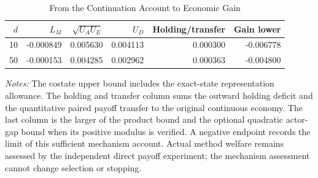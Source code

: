 \begin{table}[!htbp]
\centering
\footnotesize
\caption{From the Continuation Account to Economic Gain}\label{tab:r15mechanismwelfare}
\begin{tabular}{rrrrrr}
\toprule
$d$ & $L_M$ & $\sqrt{U_AU_E}$ & $U_D$ & Holding/transfer & Gain lower \\
\midrule
10 & -0.000849 & 0.005630 & 0.004113 & 0.000300 & -0.006778 \\
50 & -0.000153 & 0.004285 & 0.002962 & 0.000363 & -0.004800 \\
\bottomrule
\end{tabular}
\begin{minipage}{0.97\linewidth}\footnotesize
\emph{Notes:} The costate upper bound includes the exact-state representation allowance. The holding and transfer column sums the outward holding deficit and the quantitative paired payoff transfer to the original continuous economy. The last column is the larger of the product bound and the optional quadratic actor-gap bound when its positive modulus is verified. A negative endpoint records the limit of this sufficient mechanism account. Actual method welfare remains assessed by the independent direct payoff experiment; the mechanism assessment cannot change selection or stopping.
\end{minipage}
\end{table}
